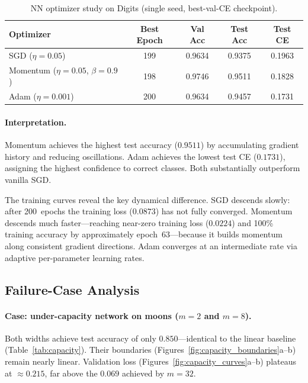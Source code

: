 \documentclass[11pt]{article}
\begin{document}
\begin{table}[H]
\centering
\caption{NN optimizer study on Digits (single seed, best-val-CE checkpoint).}
\label{tab:optimizers}
\renewcommand{\arraystretch}{1.3}
\begin{tabular}{lcccc}
\toprule
Optimizer & Best Epoch & Val Acc & Test Acc & Test CE \\
\midrule
SGD ($\eta{=}0.05$) & 199 & 0.9634 & 0.9375 & 0.1963 \\
Momentum ($\eta{=}0.05$, $\beta{=}0.9$) & 198 & 0.9746 & 0.9511 & 0.1828 \\
Adam ($\eta{=}0.001$) & 200 & 0.9634 & 0.9457 & 0.1731 \\
\bottomrule
\end{tabular}
\end{table}

\paragraph{Interpretation.}
Momentum achieves the highest test accuracy ($0.9511$) by accumulating gradient
history and reducing oscillations.
Adam achieves the lowest test CE ($0.1731$), assigning the highest confidence
to correct classes.
Both substantially outperform vanilla SGD.

The training curves reveal the key dynamical difference.
SGD descends slowly: after 200~epochs the training loss ($0.0873$) has not
fully converged.
Momentum descends much faster---reaching near-zero training loss ($0.0224$)
and 100\% training accuracy by approximately epoch~63---because it builds
momentum along consistent gradient directions.
Adam converges at an intermediate rate via adaptive per-parameter learning
rates.

\subsection{Failure-Case Analysis}
\label{subsec:failure}

\paragraph{Case: under-capacity network on moons ($m=2$ and $m=8$).}
Both widths achieve test accuracy of only $0.850$---identical to the linear
baseline (Table~\ref{tab:capacity}).
Their boundaries (Figures~\ref{fig:capacity_boundaries}a--b) remain nearly
linear.
Validation loss (Figures~\ref{fig:capacity_curves}a--b) plateaus at
$\approx0.215$, far above the $0.069$ achieved by $m=32$.
\end{document}
